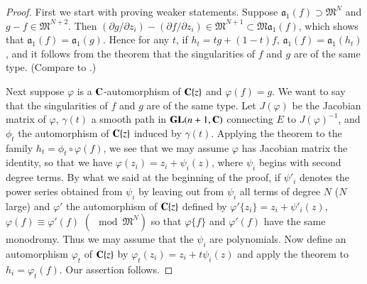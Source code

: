 \begin{proof}
First we start with proving weaker statements. Suppose $\mathfrak{a}_1 (f) \supset \mathfrak{M}^N$ and $g-f \in \mathfrak{M}^{N+2}$. Then $(\partial g / \partial z_i ) - (\partial f / \partial z_i) \in \mathfrak{M}^{N+1} \subset \mathfrak{M} \mathfrak{a}_1 (f)$, which shows that $\mathfrak{a}_1 (f) = \mathfrak{a}_1 (g)$. Hence for any $t$, if $h_t = tg + (1-t)f$, $\mathfrak{a}_1 (f) = \mathfrak{a}_1 (h_t)$, and it follows from the theorem that the singularities of $f$ and $g$ are of the same type. (Compare to \cite{art10-key15}.)

Next suppose $\varphi$ is a $\mathbf{C}$-automorphism of $\mathbf{C}\{z\}$ and $\varphi (f) = g$. We want to say that the singularities of $f$ and $g$ are of the same type. Let $J(\varphi)$ be the Jacobian matrix of $\varphi$, $\gamma (t)$ a smooth path in $\mathbf{G} \mathbf{L}(n+1, \mathbf{C})$ connecting $E$ to $J (\varphi)^{-1}$, and $\phi_t$ the automorphism of $\mathbf{C}\{z\}$ induced by $\gamma (t)$. Applying the theorem to the family $h_t = \phi_t \circ \varphi (f)$, we see that we may assume $\varphi$ has Jacobian matrix the identity, so that we have $\varphi (z_i) = z_i + \psi_i(z)$, where $\psi_i$ begins with second degree terms. By what we said at the beginning of the proof, if $\psi'_i$ denotes the power series obtained from $\psi_i$ by leaving out from $\psi_i$ all terms of degree $N$ ($N$ large) and $\varphi'$ the automorphism of $\mathbf{C}\{z\}$ defined by $\varphi'\{z_i\} = z_i + \psi'_i(z)$, $\varphi (f) \equiv \varphi'(f)$ $(\mod \mathfrak{M}^N)$ so that $\varphi \{f\}$ and $\varphi'(f)$ have the same monodromy. Thus we may assume that the $\psi_i$ are polynomials. Now define an automorphism $\varphi_t$ of $\mathbf{C}\{z\}$ by $\varphi_t(z_i) = z_i + t \psi_i (z)$ and apply the theorem to $h_i = \varphi_t (f)$. Our assertion follows.


\end{proof}
